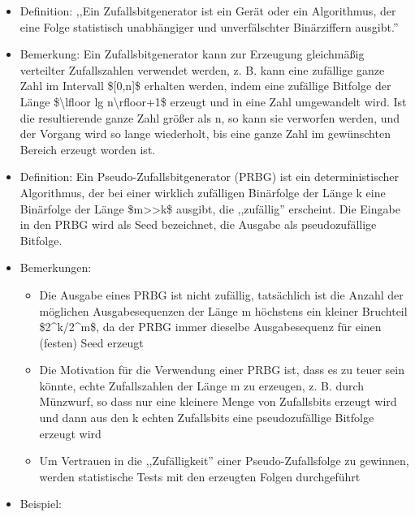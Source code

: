 \documentclass[a4paper]{article}
\begin{document}
\begin{multicols}{3}
    \begin{itemize}
        \item
              Definition: ,,Ein Zufallsbitgenerator ist ein Gerät oder ein
              Algorithmus, der eine Folge statistisch unabhängiger und
              unverfälschter Binärziffern ausgibt.''
        \item
              Bemerkung: Ein Zufallsbitgenerator kann zur Erzeugung gleichmäßig
              verteilter Zufallszahlen verwendet werden, z. B. kann eine zufällige
              ganze Zahl im Intervall \${[}0,n{]}\$ erhalten werden, indem eine
              zufällige Bitfolge der Länge \$\textbackslash lfloor lg
              n\textbackslash rfloor+1\$ erzeugt und in eine Zahl umgewandelt wird.
              Ist die resultierende ganze Zahl größer als n, so kann sie verworfen
              werden, und der Vorgang wird so lange wiederholt, bis eine ganze Zahl
              im gewünschten Bereich erzeugt worden ist.
        \item
              Definition: Ein Pseudo-Zufallsbitgenerator (PRBG) ist ein
              deterministischer Algorithmus, der bei einer wirklich zufälligen
              Binärfolge der Länge k eine Binärfolge der Länge
              \$m\textgreater\textgreater k\$ ausgibt, die ,,zufällig'' erscheint.
              Die Eingabe in den PRBG wird als Seed bezeichnet, die Ausgabe als
              pseudozufällige Bitfolge.
        \item
              Bemerkungen:

              \begin{itemize}
                  \item
                        Die Ausgabe eines PRBG ist nicht zufällig, tatsächlich ist die
                        Anzahl der möglichen Ausgabesequenzen der Länge m höchstens ein
                        kleiner Bruchteil \$2\^{}k/2\^{}m\$, da der PRBG immer dieselbe
                        Ausgabesequenz für einen (festen) Seed erzeugt
                  \item
                        Die Motivation für die Verwendung einer PRBG ist, dass es zu teuer
                        sein könnte, echte Zufallszahlen der Länge m zu erzeugen, z. B.
                        durch Münzwurf, so dass nur eine kleinere Menge von Zufallsbits
                        erzeugt wird und dann aus den k echten Zufallsbits eine
                        pseudozufällige Bitfolge erzeugt wird
                  \item
                        Um Vertrauen in die ,,Zufälligkeit'' einer Pseudo-Zufallsfolge zu
                        gewinnen, werden statistische Tests mit den erzeugten Folgen
                        durchgeführt
              \end{itemize}
        \item
              Beispiel:


\end{itemize}
\end{multicols}
\end{document}
